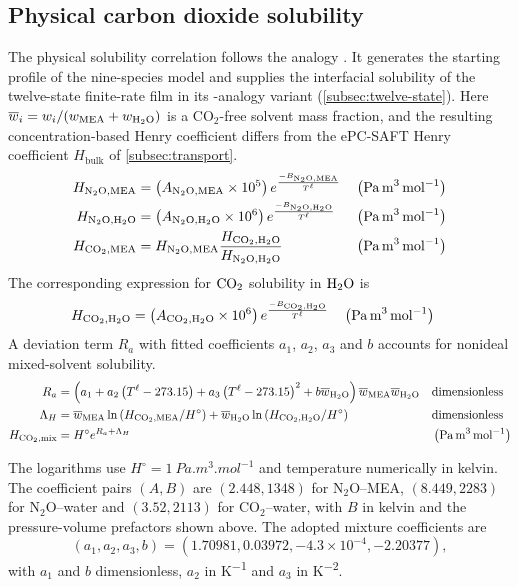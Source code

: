 \subsection{Physical carbon dioxide solubility}
The physical solubility correlation follows the \NtwoO{} analogy \cite{Jiru2012}.
It generates the starting profile of the nine-species model and supplies the interfacial solubility of the twelve-state finite-rate film in its \NtwoO{}-analogy variant (\cref{subsec:twelve-state}).
Here $\overline w_i=w_i/(w_{\MEA}+w_{\HtwoO})$ is a CO$_2$-free solvent mass fraction, and the resulting concentration-based Henry coefficient differs from the ePC-SAFT Henry coefficient $H_{\mathrm{bulk}}$ of \cref{subsec:transport}.
\begin{align}
H_{\NtwoO,\MEA} &= \left(A_{\NtwoO,\MEA} \times 10^5\right) e^{\frac{-B_{\NtwoO,\MEA}}{T^{\liq}}} && \left(\unit{Pa\,m^3\,mol^{-1}}\right)\\
H_{\NtwoO,\HtwoO} &= \left(A_{\NtwoO,\HtwoO} \times 10^6\right) e^{\frac{-B_{\NtwoO,\HtwoO}}{T^{\liq}}} && \left(\unit{Pa\,m^3\,mol^{-1}}\right)\\
H_{\COtwo,\MEA} &= H_{\NtwoO,\MEA} \frac{H_{\COtwo, \HtwoO}}{H_{\NtwoO,\HtwoO}} && \left(\unit{Pa\,m^3\,mol^{-1}}\right)
\end{align}
The corresponding expression for $\COtwo$ solubility in $\HtwoO$ is
\begin{align}
H_{\COtwo, \HtwoO} &= \left(A_{\COtwo, \HtwoO} \times 10^6\right) e^{\frac{-B_{\COtwo, \HtwoO}}{T^{\liq}}} && \left(\unit{Pa\,m^3\,mol^{-1}}\right)
\end{align}
A deviation term $R_a$ with fitted coefficients $a_1$, $a_2$, $a_3$ and $b$ accounts for nonideal mixed-solvent solubility.
\begin{align}
R_{a} &= \left(a_1+a_2 \left(T^{\liq}-273.15\right)+a_3 \left(T^{\liq}-273.15\right)^2+b \overline w_{\HtwoO}\right) \overline w_{\MEA} \overline w_{\HtwoO}
&& \text{dimensionless}\\
\Lambda_H &= \overline w_{\MEA} \ln\left(H_{\COtwo,\MEA}/H^\circ\right)+\overline w_{\HtwoO} \ln\left(H_{\COtwo,\HtwoO}/H^\circ\right)
&& \text{dimensionless}\\
H_{\COtwo,\text{mix}} &= H^\circ e^{R_{a} + \Lambda_H} && \left(\unit{Pa\,m^3\,mol^{-1}}\right)
\end{align}


The logarithms use $H^\circ=\qty{1}{Pa.m^3.mol^{-1}}$ and temperature numerically in kelvin.
The coefficient pairs $(A,B)$ are $(2.448,1348)$ for N$_2$O--MEA, $(8.449,2283)$ for N$_2$O--water and $(3.52,2113)$ for CO$_2$--water, with $B$ in kelvin and the pressure-volume prefactors shown above.
The adopted mixture coefficients are
\begin{equation}
(a_1,a_2,a_3,b)=(1.70981,0.03972,-4.3\times10^{-4},-2.20377),
\end{equation}
with $a_1$ and $b$ dimensionless, $a_2$ in \unit{K^{-1}} and $a_3$ in \unit{K^{-2}}.

